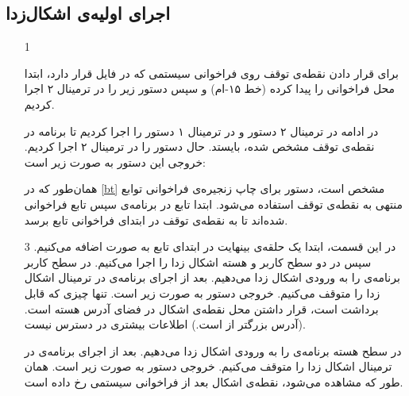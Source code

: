\subsection*{اجرای اولیه‌ی اشکال‌زدا}
\begin{itemize}
	\item[1]

	برای قرار دادن نقطه‌ی توقف روی فراخوانی سیستمی 
	که در فایل 
	قرار دارد، ابتدا محل فراخوانی را پیدا کرده (خط ۱۵-ام) و سپس دستور زیر را در ترمینال ۲ اجرا کردیم.
	
	\begin{latin}
		
	\end{latin}
	
	در ادامه در ترمینال ۲ دستور 
	و در ترمینال ۱ دستور 
	را اجرا کردیم تا برنامه در نقطه‌ی توقف مشخص شده، بایستد. حال دستور 
	را در ترمینال ۲ اجرا کردیم. خروجی این دستور به صورت زیر است:
	
	\begin{latin}
		
	\end{latin}

	همان‌طور که در 
	\ref{bt} 
	مشخص است، دستور 
	برای چاپ زنجیره‌ی فراخوانی توابع منتهی به نقطه‌ی توقف استفاده می‌شود. ابتدا تابع 
	در برنامه‌ی 
	سپس تابع 
	فراخوانی شده‌اند تا به نقطه‌ی توقف در ابتدای‌ فراخوانی تابع 
	برسد.
	
	\item[3]
	در این قسمت، ابتدا یک حلقه‌ی بینهایت در ابتدای تابع 
	به صورت 
	اضافه می‌کنیم. سپس در دو سطح کاربر و هسته اشکال زدا را اجرا می‌کنیم. در سطح کاربر برنامه‌ی 
	را به ورودی اشکال زدا می‌دهیم. بعد از اجرای برنامه‌ی 
	در ترمینال 
	اشکال زدا را متوقف می‌کنیم. خروجی دستور 
	به صورت زیر است.
	\lr{} 
	تنها چیزی که قابل برداشت است، قرار داشتن محل نقطه‌ی اشکال در فضای آدرس هسته است. (آدرس بزرگتر از 
	است.) اطلاعات بیشتری در دسترس نیست.
	
	در سطح هسته برنامه‌ی 
	را به ورودی اشکال زدا می‌دهیم. بعد از اجرای برنامه‌ی 
	در ترمینال 
	اشکال زدا را متوقف می‌کنیم. خروجی دستور 
	به صورت زیر است.
	\lr{} 
	همان طور که مشاهده می‌شود، نقطه‌ی اشکال بعد از فراخوانی سیستمی رخ داده است.
	

\end{itemize}
